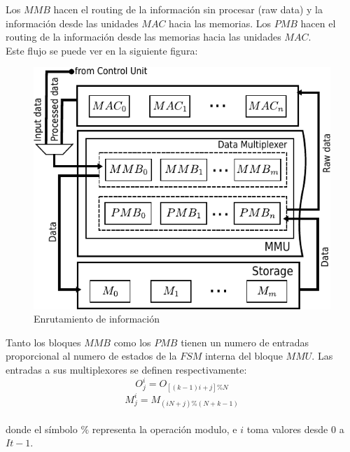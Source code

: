 \documentclass[a4paper]{article}
\begin{document}
Los $MMB$ hacen el routing de la información sin procesar (raw data) y la información desde las unidades $MAC$ hacia las memorias.
Los $PMB$ hacen el routing de la información desde las memorias hacia las unidades $MAC$.\\

Este flujo se puede ver en la siguiente figura:
\begin{figure}[H]
\centering
\includegraphics[scale=0.9]{muxes}
\caption{ Enrutamiento de información}
\label{mmu_routing}
\end{figure}
Tanto los bloques $MMB$ como los $PMB$ tienen un numero de entradas proporcional al numero de estados de la $FSM$ interna del bloque $MMU$. 
Las entradas a sus multiplexores se definen respectivamente:
\begin{equation}%
  O_j^i = O_{[(k-1)i+j]\%N}
\end{equation}
\begin{equation}%
  M_j^i = M_{(iN+j)\%(N+k-1)}
\end{equation}
\\
donde el símbolo $ \% $ representa la operación modulo, e $i$ toma valores desde $0$ a $It-1$.
\end{document}

